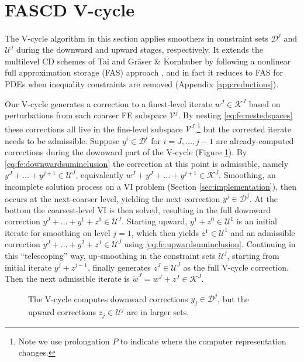 \documentclass[letterpaper,final,12pt,reqno]{amsart}
\theoremstyle{cstyle}
\theoremstyle{cstyle*}
\theoremstyle{dstyle}
\numberwithin{equation}{section}
\numberwithin{figure}{section}
\numberwithin{table}{section}
\numberwithin{theorem}{section}
\newcommand{\fascd}{\pr{fascd}\xspace}
\begin{document}
\section{FASCD V-cycle} \label{sec:vcycle}

The V-cycle algorithm in this section applies smoothers in constraint sets $\mathcal{D}^j$ and $\mathcal{U}^j$ during the downward and upward stages, respectively.  It extends the multilevel CD schemes of Tai \cite{Tai2003} and Gr\"aser \& Kornhuber \cite[Algorithm 4.7]{GraeserKornhuber2009} by following a nonlinear full approximation storage (FAS) approach \cite{BrandtLivne2011}, and in fact it reduces to FAS for PDEs when inequality constraints are removed (Appendix \ref{app:reductions}).

Our V-cycle generates a correction to a finest-level iterate $w^J \in \mathcal{K}^J$ based on perturbations from each coarser FE subspace $\mathcal{V}^j$.  By nesting \eqref{eq:fe:nestedspaces} these corrections all live in the fine-level subspace $\mathcal{V}^J$,\footnote{Note we use prolongation $P$ to indicate where the computer representation changes.} but the corrected iterate needs to be admissible.  Suppose $y^i \in \mathcal{D}^i$ for $i=J,\dots,j-1$ are already-computed corrections during the downward part of the V-cycle (Figure \ref{fig:fascdvcycle}).  By \eqref{eq:fe:downwardsuminclusion} the correction at this point is admissible, namely $y^J + \dots + y^{j+1} \in \mathcal{U}^J$, equivalently $w^J + y^J + \dots + y^{j+1} \in \mathcal{K}^J$.  Smoothing, an incomplete solution process on a VI problem (Section \ref{sec:implementation}), then occurs at the next-coarser level, yielding the next correction $y^j \in \mathcal{D}^j$.  At the bottom the coarsest-level VI is then solved, resulting in the full downward correction $y^J + \dots + y^1 + z^0 \in \mathcal{U}^J$.  Starting upward, $y^1 + z^0 \in \mathcal{U}^1$ is an initial iterate for smoothing on level $j=1$, which then yields $z^1 \in \mathcal{U}^1$ and an admissible correction $y^J + \dots + y^2 + z^1 \in \mathcal{U}^J$ using \eqref{eq:fe:upwardsuminclusion}.  Continuing in this ``telescoping'' way, up-smoothing in the constraint sets $\mathcal{U}^j$, starting from initial iterate $y^j+z^{j-1}$, finally generates $z^J\in \mathcal{U}^J$ as the full V-cycle correction.  Then the next admissible iterate is $\tilde{w}^J = w^J + z^J \in \mathcal{K}^J$.

\begin{figure}[ht]
\begin{center}

\end{center}
\caption{The \fascd V-cycle computes downward corrections $y_j \in \mathcal{D}^j$, but the upward corrections $z_j\in\mathcal{U}^j$ are in larger sets.}
\label{fig:fascdvcycle}
\end{figure}
\end{document}

